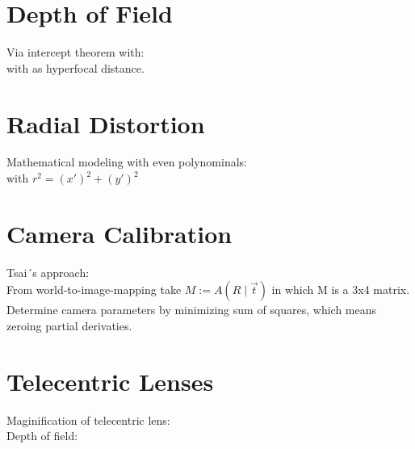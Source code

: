 \documentclass[a4paper,12pt,pdftex]{scrreprt}
\begin{document}
	\section{Depth of Field} %
	\label{sec:depth_of_field}
	Via intercept theorem with:\\
	 with  as hyperfocal distance.

	\section{Radial Distortion} %
	\label{sec:radial_distortion}
	Mathematical modeling with even polynominals:\\
	 with $r^{2}=(x')^{2}+(y')^{2}$

	\section{Camera Calibration} %
	\label{sec:camera_calibration}
	Tsai´s approach:\\
	From world-to-image-mapping take $M:=A\left(R\mid\vec{t}\right)$ in which M is a 3x4 matrix.\\
	Determine camera parameters by minimizing sum of squares, which means zeroing partial derivaties.\\

	\section{Telecentric Lenses} %
	\label{sec:telecentric_lenses}
	Maginification of telecentric lens: \\
	Depth of field:
\end{document}
